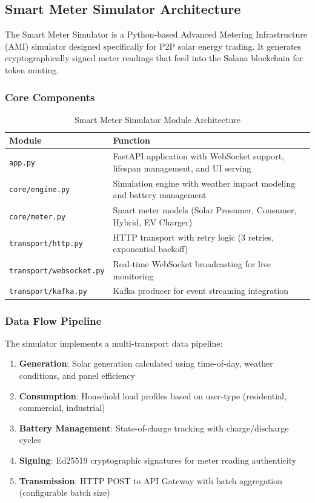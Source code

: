\documentclass[conference]{IEEEtran}
\begin{document}
\subsection{Smart Meter Simulator Architecture}

The Smart Meter Simulator is a Python-based Advanced Metering Infrastructure (AMI) simulator designed specifically for P2P solar energy trading. It generates cryptographically signed meter readings that feed into the Solana blockchain for token minting.

\subsubsection{Core Components}

\begin{table}[htbp]
\caption{Smart Meter Simulator Module Architecture}
\begin{center}
\begin{tabular}{lp{8cm}}
\toprule
\textbf{Module} & \textbf{Function} \\
\midrule
\texttt{app.py} & FastAPI application with WebSocket support, lifespan management, and UI serving \\
\texttt{core/engine.py} & Simulation engine with weather impact modeling and battery management \\
\texttt{core/meter.py} & Smart meter models (Solar Prosumer, Consumer, Hybrid, EV Charger) \\
\texttt{transport/http.py} & HTTP transport with retry logic (3 retries, exponential backoff) \\
\texttt{transport/websocket.py} & Real-time WebSocket broadcasting for live monitoring \\
\texttt{transport/kafka.py} & Kafka producer for event streaming integration \\
\bottomrule
\end{tabular}
\label{tab:simulator-modules}
\end{center}
\end{table}

\subsubsection{Data Flow Pipeline}

The simulator implements a multi-transport data pipeline:

\begin{enumerate}
    \item \textbf{Generation}: Solar generation calculated using time-of-day, weather conditions, and panel efficiency
    \item \textbf{Consumption}: Household load profiles based on user-type (residential, commercial, industrial)
    \item \textbf{Battery Management}: State-of-charge tracking with charge/discharge cycles
    \item \textbf{Signing}: Ed25519 cryptographic signatures for meter reading authenticity
    \item \textbf{Transmission}: HTTP POST to API Gateway with batch aggregation (configurable batch size)
\end{enumerate}
\end{document}
